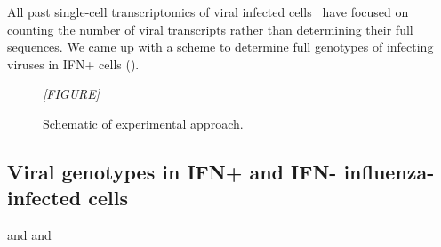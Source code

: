 \documentclass[9pt,lineno]{elife}
\newcommand{\jdbcomment}[1]{\emph{\color{red} [#1]}}
\begin{document}
All past single-cell transcriptomics of viral infected cells~\citep{russell2018extreme,zanini2018single,steuerman2018dissection,zanini2018virus} have focused on counting the number of viral transcripts rather than determining their full sequences.
We came up with a scheme to determine full genotypes of infecting viruses in IFN+ cells ().

\begin{figure}

\centerline{\jdbcomment{FIGURE}}

\caption{
Schematic of experimental approach.
}

\end{figure}


\subsection{Viral genotypes in IFN+ and IFN- influenza-infected cells}
 and  and 
\end{document}
